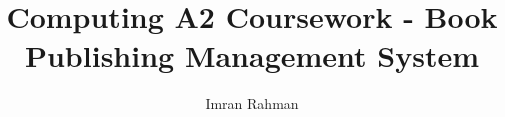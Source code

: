 \documentclass{report}
\begin{document}
\title{Computing A2 Coursework - Book Publishing Management System}
\author{Imran Rahman}
\maketitle
\tableofcontents






\end{document}
